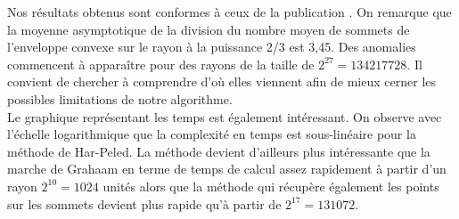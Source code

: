 Nos résultats obtenus sont conformes à ceux de la publication \cite{HarPeled98}. On remarque que la moyenne asymptotique de la division du nombre moyen de sommets de l'enveloppe convexe sur le rayon à la puissance 2/3 est 3,45. Des anomalies commencent à apparaître pour des rayons de la taille de $2^{27} = 134217728$. Il convient de chercher à comprendre d'où elles viennent afin de mieux cerner les possibles limitations de notre algorithme.\\

Le graphique représentant les temps est également intéressant. On observe avec l'échelle logarithmique que la complexité en temps est sous-linéaire pour la méthode de Har-Peled. La méthode devient d'ailleurs plus intéressante que la marche de Grahaam en terme de temps de calcul assez rapidement à partir d'un rayon $2^{10} = 1024$ unités alors que la méthode qui récupère également les points sur les sommets devient plus rapide qu'à partir de $2^{17} = 131072$.




